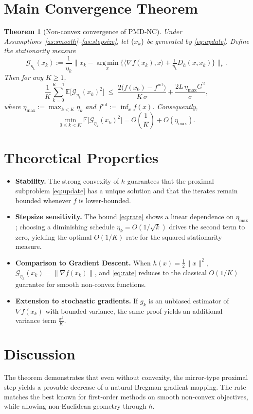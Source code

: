 \documentclass{article}
\newtheorem{theorem}{Theorem}
\newcommand{\EE}{\mathbb{E}}
\newcommand{\argmin}{\operatorname*{arg\,min}}
\newcommand{\grad}{\nabla}
\newcommand{\D}{D_h}
\begin{document}
\section*{Main Convergence Theorem}
\begin{theorem}[Non‑convex convergence of PMD‑NC]\label{thm:main}
Under Assumptions~\ref{as:smooth}--\ref{as:stepsize}, let $\{x_k\}$ be generated by \eqref{eq:update}. Define the stationarity measure
\[
\mathcal{G}_{\eta_k}(x_k):=\frac{1}{\eta_k}\bigl\|x_k-\argmin_{x}\{\langle \grad f(x_k),x\rangle+\tfrac{1}{\eta_k}\D(x,x_k)\}\bigr\|_{*}.
\]
Then for any $K\ge 1$,
\begin{equation}
\frac{1}{K}\sum_{k=0}^{K-1}\EE\big[\mathcal{G}_{\eta_k}(x_k)^{2}\big]\;\le\;
\frac{2\big(f(x_0)-f^{\inf}\big)}{K\,\sigma}+\frac{2L\,\eta_{\max}G^{2}}{\sigma},
\label{eq:rate}
\end{equation}
where $\eta_{\max}:=\max_{k< K}\eta_k$ and $f^{\inf}:=\inf_{x}f(x)$. Consequently,
\[
\min_{0\le k<K}\EE\big[\mathcal{G}_{\eta_k}(x_k)^{2}\big]=O\!\left(\frac{1}{K}\right)+O(\eta_{\max}).
\]
\end{theorem}

\section*{Theoretical Properties}
\begin{itemize}
\item \textbf{Stability.} The strong convexity of $h$ guarantees that the proximal subproblem \eqref{eq:update} has a unique solution and that the iterates remain bounded whenever $f$ is lower‑bounded.
\item \textbf{Stepsize sensitivity.} The bound \eqref{eq:rate} shows a linear dependence on $\eta_{\max}$; choosing a diminishing schedule $\eta_k=O(1/\sqrt{k})$ drives the second term to zero, yielding the optimal $O(1/K)$ rate for the squared stationarity measure.
\item \textbf{Comparison to Gradient Descent.} When $h(x)=\tfrac12\|x\|^{2}$, $\mathcal{G}_{\eta_k}(x_k)=\|\grad f(x_k)\|$, and \eqref{eq:rate} reduces to the classical $O(1/K)$ guarantee for smooth non‑convex functions.
\item \textbf{Extension to stochastic gradients.} If $g_k$ is an unbiased estimator of $\grad f(x_k)$ with bounded variance, the same proof yields an additional variance term $\frac{\sigma^{2}}{K}$.
\end{itemize}

\section*{Discussion}
The theorem demonstrates that even without convexity, the mirror‑type proximal step yields a provable decrease of a natural Bregman‑gradient mapping. The rate matches the best known for first‑order methods on smooth non‑convex objectives, while allowing non‑Euclidean geometry through $h$.
\end{document}
